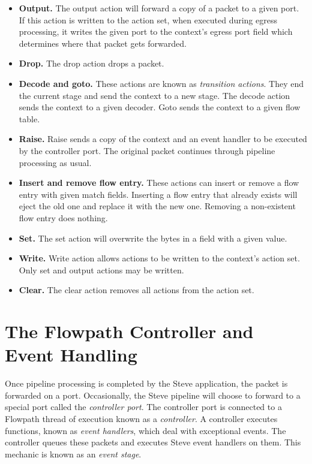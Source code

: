 \begin{itemize}

\item \textbf{Output.} The output action will forward a copy of a packet to a given
port. If this action is written to the action set, when executed during egress
processing, it writes the given port to the context's egress port field which
determines where that packet gets forwarded.

\item \textbf{Drop.} The drop action drops a packet.

\item \textbf{Decode and goto.} These actions are known as \textit{transition
actions}. They end the current stage and send the context to a new stage. The
decode action sends the context to a given decoder. Goto sends the context to a
given flow table.

\item \textbf{Raise.} Raise sends a copy of the context and an event handler to be
executed by the controller port. The original packet continues through pipeline
processing as usual.

\item \textbf{Insert and remove flow entry.} These actions can insert or remove a flow
entry with given match fields. Inserting a flow entry that already exists will
eject the old one and replace it with the new one. Removing a non-existent flow
entry does nothing.

\item \textbf{Set.} The set action will overwrite the bytes in a field with a given
value.

\item \textbf{Write.} Write action allows actions to be written to the context's
action set. Only set and output actions may be written.

\item \textbf{Clear.} The clear action removes all actions from the action set.

\end{itemize}

\section{The Flowpath Controller and Event Handling} \label{events_desc}

Once pipeline processing is completed by the Steve application, the packet is forwarded on a port. Occasionally, the Steve pipeline will choose to forward to a special port called the \textit{controller port}. The controller port is connected to a Flowpath thread of execution known as a \textit{controller}. A controller executes functions, known as \textit{event handlers}, which deal with exceptional events. The controller queues these packets and executes Steve event handlers on them. This mechanic is known as an \textit{event stage}.

